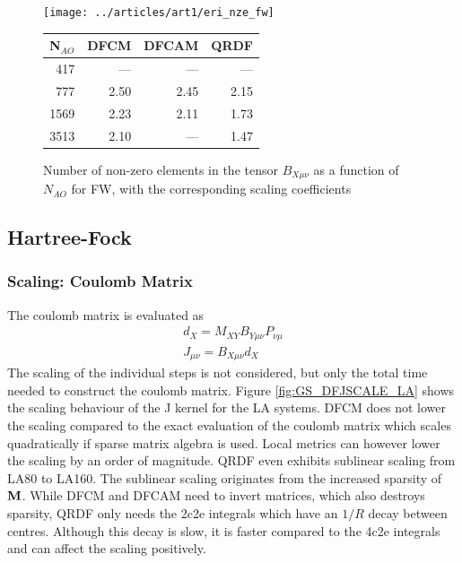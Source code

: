 \begin{figure}
\begin{minipage}{0.5\textwidth}
\centering
\texttt{[image: ../articles/art1/eri\_nze\_fw]}
\end{minipage}
\begin{minipage}{0.4\textwidth}
\centering
\begin{tabular}{rrrr}
\hline
N$_{AO}$ & DFCM & DFCAM & QRDF \\ \hline
417 & --- & --- & --- \\ 
777 & 2.50 & 2.45 & 2.15 \\ 
1569 & 2.23 & 2.11 & 1.73 \\ 
3513 & 2.10 & --- & 1.47 \\ \hline
\end{tabular}
\end{minipage}
\caption{Number of non-zero elements in the tensor $B_{X\mu\nu}$ as a function of $N_{AO}$ for FW, with the corresponding scaling coefficients}
\label{fig:GS_BNZE_FW}
\end{figure}

\subsection{Hartree-Fock}

\subsubsection{Scaling: Coulomb Matrix}

The coulomb matrix is evaluated as
\begin{align}
d_X = M_{XY} B_{Y\mu\nu} P_{\nu\mu} \\
J_{\mu\nu} = B_{X\mu\nu} d_X
\end{align}
\noindent The scaling of the individual steps is not considered, but only the total time needed to construct the coulomb matrix. Figure \ref{fig:GS_DFJSCALE_LA} shows the scaling behaviour of the J kernel for the LA systems. DFCM does not lower the scaling compared to the exact evaluation of the coulomb matrix which scales quadratically if sparse matrix algebra is used. Local metrics can however lower the scaling by an order of magnitude. QRDF even exhibits sublinear scaling from LA80 to LA160. The sublinear scaling originates from the increased sparsity of $\mathbf{M}$. While DFCM and DFCAM need to invert matrices, which also destroys sparsity, QRDF only needs the 2c2e integrals which have an $1/R$ decay between centres. Although this decay is slow, it is faster compared to the 4c2e integrals and can affect the scaling positively.

